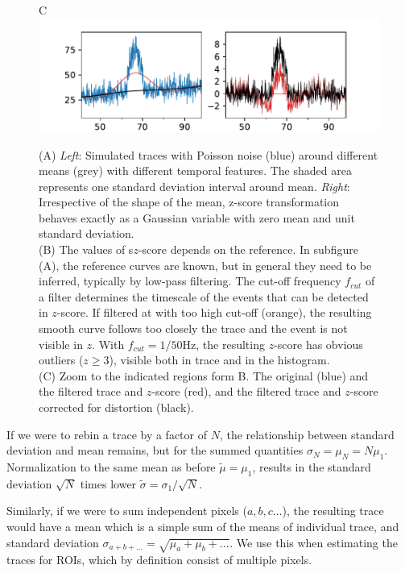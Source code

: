 \documentclass[a4paper,11pt,]{article}
\begin{document}
\begin{figure}[t]
\begin{minipage}{.49\textwidth}
        {\selectfont C} \includegraphics[scale=.48,trim=5mm 0mm 0 0,clip,align=t]{figures/z_score_3.pdf}
    \end{minipage}
    \caption{
    (A) \emph{Left}: Simulated traces with Poisson noise (blue) around different means (grey) with different temporal features. The shaded area represents one standard deviation interval around mean. 
    \emph{Right}: Irrespective of the shape of the mean, z-score transformation behaves exactly as a Gaussian variable with zero mean and unit standard deviation.\\
    (B) The values of s$z$-score depends on the reference. In subfigure (A), the reference curves are known, but in general they need to be inferred, typically by low-pass filtering. The cut-off frequency $f_{cut}$ of a filter determines the timescale of the events that can be detected in $z$-score. If filtered at with too high cut-off (orange), the resulting smooth curve follows too closely the trace and the event is not visible in $z$. With $f_{cut}=1/50$Hz, the resulting $z$-score has obvious outliers ($z\geq 3$), visible both in trace and in the histogram.\\
    (C) Zoom to the indicated regions form B. The original (blue) and the filtered trace and $z$-score (red), and the filtered trace and $z$-score corrected for distortion (black).
    \label{fig:z_score}
    }
\end{figure}

If we were to rebin a trace by a factor of $N$, the relationship between standard deviation and mean remains, but for the summed quantities $\sigma_N=\mu_N=N\mu_1$.
Normalization to the same mean as before $\tilde{\mu} = \mu_1$, results in the standard deviation $\sqrt{N}$ times lower $\tilde{\sigma} = \sigma_1/\sqrt{N}$.

Similarly, if we were to sum independent pixels ($a, b, c\dots$), 
the resulting trace would have a mean which is a simple sum of the means of individual trace, and standard deviation 
$\sigma_{a+b+\dots} = \sqrt{\mu_a+\mu_b+\dots}$. We use this when estimating the traces for ROIs, which by definition consist of multiple pixels.
\end{document}
